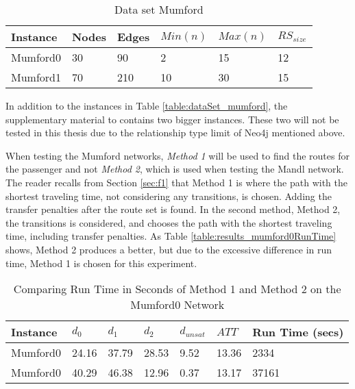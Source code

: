 \begin{table}[H]
	\centering
	\begin{tabular}{|l|l|l|l|l|l|}
    	\hline
    	Instance & Nodes&Edges & $Min(n)$ & $Max(n)$ & $RS_{size}$\\
    	\hline
   	    Mumford0 & 30&90 & 2&15 & 12 \\
   	    Mumford1 & 70&210 & 10&30 & 15 \\
   	    \hline
    \end{tabular}
    \caption{Data set Mumford}
    \label{table:dataSet_mumford}
\end{table}

In addition to the instances in Table \vref{table:dataSet_mumford}, the supplementary material to \citet{mumford13} contains two bigger instances. These two will not be tested in this thesis due to the relationship type limit of Neo4j mentioned above. 

When testing the Mumford networks, \textit{Method 1} will be used to find the routes for the passenger and not \textit{Method 2}, which is used when testing the Mandl network. The reader recalls from Section \vref{sec:f1} that Method 1 is where the path with the shortest traveling time, not considering any transitions, is chosen. Adding the transfer penalties after the route set is found. In the second method, Method 2, the transitions is considered, and chooses the path with the shortest traveling time, including transfer penalties. As Table \vref{table:results_mumford0RunTime} shows, Method 2 produces a better, but due to the excessive difference in run time, Method 1 is chosen for this experiment. 

\begin{table}[H]
    \centering
    \begin{tabular}{|l|l|l|l|l|l|l|}
        \hline
        Instance & $d_0$ & $d_1$ & $d_2$ & $d_{unsat}$ & $ATT$ & Run Time (secs) \\
        \hline
        Mumford0 & 24.16 & 37.79 & 28.53 & 9.52 & 13.36 & 2334 \\
        Mumford0 & 40.29 & 46.38 & 12.96 & 0.37 & 13.17 & 37161 \\
        \hline
    \end{tabular}
    \caption{Comparing Run Time in Seconds of Method 1 and Method 2 on the Mumford0 Network}
    \label{table:results_mumford0RunTime}
\end{table}

